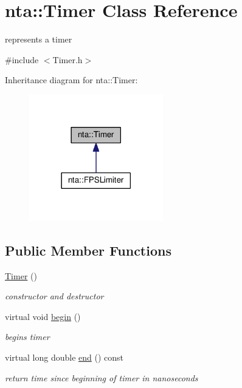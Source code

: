 \hypertarget{classnta_1_1Timer}{}\section{nta\+:\+:Timer Class Reference}
\label{classnta_1_1Timer}


represents a timer  




{\ttfamily \#include $<$Timer.\+h$>$}



Inheritance diagram for nta\+:\+:Timer\+:\nopagebreak
\begin{figure}[H]
\begin{center}
\leavevmode
\includegraphics[width=165pt]{d3/d1b/classnta_1_1Timer__inherit__graph}
\end{center}
\end{figure}
\subsection*{Public Member Functions}
\begin{DoxyCompactItemize}
\item 
\mbox{\label{classnta_1_1Timer_ac92420dd62672b399f1b4adfd81a4007}} 
\hyperlink{classnta_1_1Timer_ac92420dd62672b399f1b4adfd81a4007}{Timer} ()
\begin{DoxyCompactList}\small\item\em constructor and destructor \end{DoxyCompactList}\item 
\mbox{\label{classnta_1_1Timer_a4192089df7b162096d119a7d9438173f}} 
virtual void \hyperlink{classnta_1_1Timer_a4192089df7b162096d119a7d9438173f}{begin} ()
\begin{DoxyCompactList}\small\item\em begins timer \end{DoxyCompactList}\item 
\mbox{\label{classnta_1_1Timer_adb7a179f51224cca3e4c2f8f8bc20a19}} 
virtual long double \hyperlink{classnta_1_1Timer_adb7a179f51224cca3e4c2f8f8bc20a19}{end} () const
\begin{DoxyCompactList}\small\item\em return time since beginning of timer in nanoseconds \end{DoxyCompactList}\end{DoxyCompactItemize}

